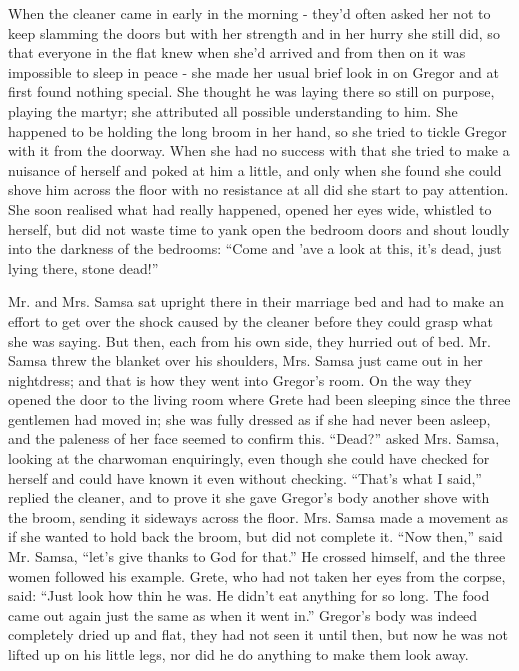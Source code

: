 \documentclass[12pt]{report}
\begin{document}
When the cleaner came in early in the morning - they'd often asked her
not to keep slamming the doors but with her strength and in her hurry
she still did, so that everyone in the flat knew when she'd arrived and
from then on it was impossible to sleep in peace - she made her usual
brief look in on Gregor and at first found nothing special. She thought
he was laying there so still on purpose, playing the martyr; she
attributed all possible understanding to him. She happened to be holding
the long broom in her hand, so she tried to tickle Gregor with it from
the doorway. When she had no success with that she tried to make a
nuisance of herself and poked at him a little, and only when she found
she could shove him across the floor with no resistance at all did she
start to pay attention. She soon realised what had really happened,
opened her eyes wide, whistled to herself, but did not waste time to
yank open the bedroom doors and shout loudly into the darkness of the
bedrooms: ``Come and 'ave a look at this, it's dead, just lying there,
stone dead!''

Mr. and Mrs. Samsa sat upright there in their marriage bed and had to
make an effort to get over the shock caused by the cleaner before they
could grasp what she was saying. But then, each from his own side, they
hurried out of bed. Mr. Samsa threw the blanket over his shoulders, Mrs.
Samsa just came out in her nightdress; and that is how they went into
Gregor's room. On the way they opened the door to the living room where
Grete had been sleeping since the three gentlemen had moved in; she was
fully dressed as if she had never been asleep, and the paleness of her
face seemed to confirm this. ``Dead?'' asked Mrs. Samsa, looking at the
charwoman enquiringly, even though she could have checked for herself
and could have known it even without checking. ``That's what I said,''
replied the cleaner, and to prove it she gave Gregor's body another
shove with the broom, sending it sideways across the floor. Mrs. Samsa
made a movement as if she wanted to hold back the broom, but did not
complete it. ``Now then,'' said Mr. Samsa, ``let's give thanks to God
for that.'' He crossed himself, and the three women followed his
example. Grete, who had not taken her eyes from the corpse, said: ``Just
look how thin he was. He didn't eat anything for so long. The food came
out again just the same as when it went in.'' Gregor's body was indeed
completely dried up and flat, they had not seen it until then, but now
he was not lifted up on his little legs, nor did he do anything to make
them look away.
\end{document}
